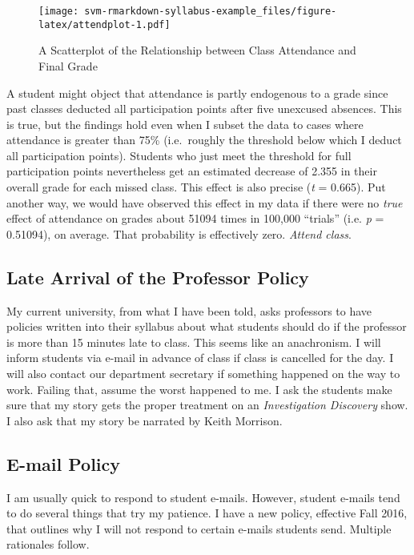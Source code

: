 \documentclass[]{article}
\makeatletter
\def\maxwidth{\ifdim\Gin@nat@width>\linewidth\linewidth
\else\Gin@nat@width\fi}
\let\Oldincludegraphics\includegraphics
\renewcommand{\includegraphics}[1]{\Oldincludegraphics[width=\maxwidth]{#1}}
\makeatother
\begin{document}
\begin{figure}
\centering
\texttt{[image: svm-rmarkdown-syllabus-example\_files/figure-latex/attendplot-1.pdf]}
\caption{A Scatterplot of the Relationship between Class Attendance and
Final Grade}
\end{figure}

A student might object that attendance is partly endogenous to a grade
since past classes deducted all participation points after five
unexcused absences. This is true, but the findings hold even when I
subset the data to cases where attendance is greater than 75\%
(i.e.~roughly the threshold below which I deduct all participation
points). Students who just meet the threshold for full participation
points nevertheless get an estimated decrease of 2.355 in their overall
grade for each missed class. This effect is also precise (\emph{t} =
0.665). Put another way, we would have observed this effect in my data
if there were no \emph{true} effect of attendance on grades about 51094
times in 100,000 ``trials'' (i.e. \emph{p} = 0.51094), on average. That
probability is effectively zero. \emph{Attend class}.

\subsection{Late Arrival of the Professor
Policy}\label{late-arrival-of-the-professor-policy}

My current university, from what I have been told, asks professors to
have policies written into their syllabus about what students should do
if the professor is more than 15 minutes late to class. This seems like
an anachronism. I will inform students via e-mail in advance of class if
class is cancelled for the day. I will also contact our department
secretary if something happened on the way to work. Failing that, assume
the worst happened to me. I ask the students make sure that my story
gets the proper treatment on an \emph{Investigation Discovery} show. I
also ask that my story be narrated by Keith Morrison.

\subsection{E-mail Policy}\label{e-mail-policy}

I am usually quick to respond to student e-mails. However, student
e-mails tend to do several things that try my patience. I have a new
policy, effective Fall 2016, that outlines why I will not respond to
certain e-mails students send. Multiple rationales follow.
\end{document}
